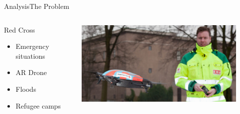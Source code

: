 \begin{frame}{Analysis}{The Problem}
    \begin{columns}[T]
        \begin{column}{.4\textwidth}
            \begin{block}{Red Cross}
                \begin{itemize}
                    \item Emergency situations
                    \item AR Drone
                    \item Floods
                    \item Refugee camps
                \end{itemize}
            \end{block}
        \end{column}
        \begin{column}{.6\textwidth}
            \includegraphics[width=0.9\textwidth]{images/red-cross_drone.jpg}
        \end{column}
    \end{columns}
\end{frame}

